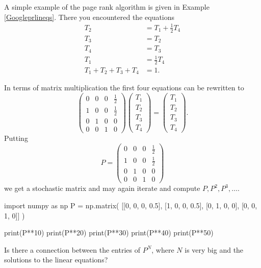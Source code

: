 \documentclass{article}
\begin{document}
\begin{example}

  A simple example of the page rank algorithm is
  given in Example \ref{Googleprlineqs}. There you
  encountered the equations
  \begin{align*}
    T_2 &= T_1 + \tfrac{1}{2} T_4\\
    T_3 &= T_2\\
    T_4 &= T_3\\
    T_1 &= \tfrac{1}{2} T_4\\
    T_1 + T_2 + T_3 + T_4 &= 1.
  \end{align*}
  
  In terms of matrix multiplication the first four equations can be rewritten to
  $$
  \begin{pmatrix}
    0 & 0 & 0 & \tfrac{1}{2} \\[5pt]
    1 & 0 & 0 & \tfrac{1}{2}\\[5pt]
    0 & 1 & 0 & 0 \\[5pt]
    0 & 0 & 1 & 0 
  \end{pmatrix}
  \begin{pmatrix}
    T_1 \\[5pt] T_2 \\[5pt] T_3 \\[5pt] T_4
  \end{pmatrix} =
  \begin{pmatrix}
    T_1 \\[5pt] T_2 \\[5pt] T_3 \\[5pt] T_4
  \end{pmatrix}.
  $$
  Putting
  $$
  P = \begin{pmatrix}
    0 & 0 & 0 & \tfrac{1}{2} \\[5pt]
    1 & 0 & 0 & \tfrac{1}{2}\\[5pt]
    0 & 1 & 0 & 0 \\[5pt]
    0 & 0 & 1 & 0 
  \end{pmatrix}
  $$
  we get a stochastic matrix and  may again iterate and compute $P, P^2, P^3, \dots$.

\begin{sage}
import numpy as np
P = np.matrix( [[0, 0, 0, 0.5], [1, 0, 0, 0.5], [0, 1, 0, 0], [0, 0, 1, 0]] )

print(P**10)
print(P**20)
print(P**30)
print(P**40)
print(P**50)
\end{sage}

Is there a connection between the entries of $P^N$, where $N$ is very big and the solutions to the linear equations? 
\end{example}
\end{document}
